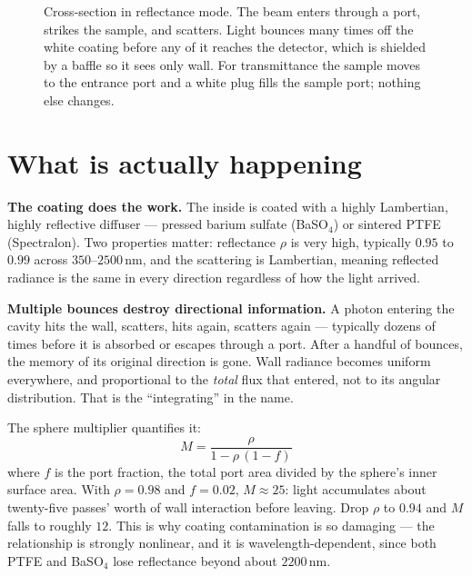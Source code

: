 \documentclass[11pt,letterpaper]{article}
\begin{document}
\begin{figure}[htbp]
\caption{Cross-section in reflectance mode. The beam enters through a port, strikes the sample, and
scatters. Light bounces many times off the white coating before any of it reaches the detector,
which is shielded by a baffle so it sees only wall. For transmittance the sample moves to the
entrance port and a white plug fills the sample port; nothing else changes.}
\label{fig:sphere}
\end{figure}

\section{What is actually happening}

\textbf{The coating does the work.} The inside is coated with a highly Lambertian, highly reflective
diffuser --- pressed barium sulfate (BaSO$_4$) or sintered PTFE (Spectralon). Two properties matter:
reflectance $\rho$ is very high, typically $0.95$ to $0.99$ across $350$--$2500$\,nm, and the
scattering is Lambertian, meaning reflected radiance is the same in every direction regardless of
how the light arrived.

\textbf{Multiple bounces destroy directional information.} A photon entering the cavity hits the
wall, scatters, hits again, scatters again --- typically dozens of times before it is absorbed or
escapes through a port. After a handful of bounces, the memory of its original direction is gone.
Wall radiance becomes uniform everywhere, and proportional to the \emph{total} flux that entered,
not to its angular distribution. That is the ``integrating'' in the name.

The sphere multiplier quantifies it:
\begin{equation}
  M = \frac{\rho}{1 - \rho\,(1-f)}
  \label{eq:multiplier}
\end{equation}
where $f$ is the port fraction, the total port area divided by the sphere's inner surface area. With
$\rho = 0.98$ and $f = 0.02$, $M \approx 25$: light accumulates about twenty-five passes' worth of
wall interaction before leaving. Drop $\rho$ to $0.94$ and $M$ falls to roughly $12$. This is why
coating contamination is so damaging --- the relationship is strongly nonlinear, and it is
wavelength-dependent, since both PTFE and BaSO$_4$ lose reflectance beyond about $2200$\,nm.
\end{document}

